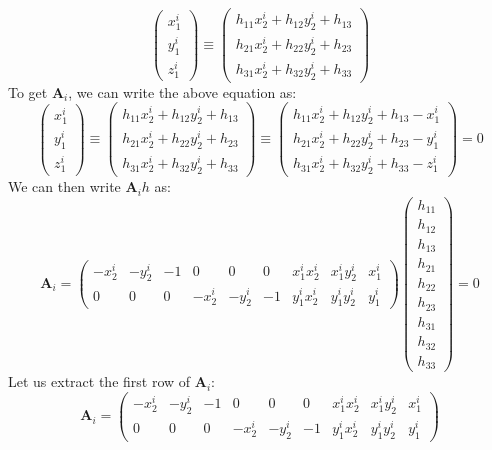 \documentclass[a3paper,12pt]{extarticle} %
\begin{document}
\begin{enumerate}
\[        \]
        \[
        \begin{pmatrix} x_1^i \\ y_1^i \\ z_1^i \end{pmatrix} \equiv \begin{pmatrix} h_{11} x_2^i + h_{12} y_2^i + h_{13} \\ h_{21} x_2^i + h_{22} y_2^i + h_{23} \\ h_{31} x_2^i + h_{32} y_2^i + h_{33} \end{pmatrix}
        \]
        To get $\mathbf{A}_i$, we can write the above equation as:
        \[
        \begin{pmatrix} x_1^i \\ y_1^i \\ z_1^i \end{pmatrix} \equiv \begin{pmatrix} h_{11} x_2^i + h_{12} y_2^i + h_{13} \\ h_{21} x_2^i + h_{22} y_2^i + h_{23} \\ h_{31} x_2^i + h_{32} y_2^i + h_{33} \end{pmatrix} \equiv \begin{pmatrix} h_{11} x_2^i + h_{12} y_2^i + h_{13} - x_1^i \\ h_{21} x_2^i + h_{22} y_2^i + h_{23} - y_1^i \\ h_{31} x_2^i + h_{32} y_2^i + h_{33} - z_1^i \end{pmatrix} = 0
        \]
        We can then write $\mathbf{A}_ih$ as:
        \[
        \mathbf{A}_i = \begin{pmatrix} -x_2^i & -y_2^i & -1 & 0 & 0 & 0 & x_1^i x_2^i & x_1^i y_2^i & x_1^i \\ 0 & 0 & 0 & -x_2^i & -y_2^i & -1 & y_1^i x_2^i & y_1^i y_2^i & y_1^i \end{pmatrix} \begin{pmatrix} h_{11} \\ h_{12} \\ h_{13} \\ h_{21} \\ h_{22} \\ h_{23} \\ h_{31} \\ h_{32} \\ h_{33} \end{pmatrix} = 0
        \]
        Let us extract the first row of $\mathbf{A}_i$:
        \[
        \mathbf{A}_i = \begin{pmatrix} -x_2^i & -y_2^i & -1 & 0 & 0 & 0 & x_1^i x_2^i & x_1^i y_2^i & x_1^i \\ 0 & 0 & 0 & -x_2^i & -y_2^i & -1 & y_1^i x_2^i & y_1^i y_2^i & y_1^i \end{pmatrix}
        \]


\end{enumerate}
\end{document}
